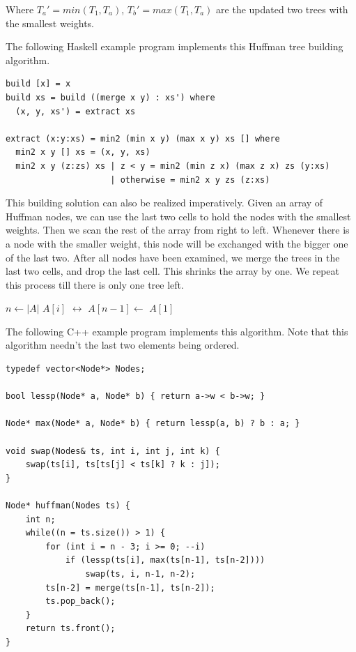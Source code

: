 \documentclass[UTF8]{article}
\begin{document}
Where $T_a' = min(T_1, T_a)$, $T_b' = max(T_1, T_a)$ are the updated two trees with
the smallest weights.

The following Haskell example program implements this Huffman tree building algorithm.

\lstset{language=Haskell}
\begin{lstlisting}
build [x] = x
build xs = build ((merge x y) : xs') where
  (x, y, xs') = extract xs

extract (x:y:xs) = min2 (min x y) (max x y) xs [] where
  min2 x y [] xs = (x, y, xs)
  min2 x y (z:zs) xs | z < y = min2 (min z x) (max z x) zs (y:xs)
                     | otherwise = min2 x y zs (z:xs)
\end{lstlisting}

This building solution can also be realized imperatively. Given an array of Huffman
nodes, we can use the last two cells to hold the nodes with the smallest weights.
Then we scan the rest of the array from right to left. Whenever there is a node with
the smaller weight, this node will be exchanged with the bigger one of the last two.
After all nodes have been examined, we merge the trees in the last two cells, and drop
the last cell. This shrinks the array by one. We repeat this process till there is only
one tree left.

\begin{algorithmic}[1]
    \State $n \gets |A|$
        \State {} $A[i]$ $\leftrightarrow$ 
      \EndIf
    \EndFor
    \State $A[n-1] \gets$ 
    \State {}
  \EndWhile
  \State \Return $A[1]$
\EndFunction
\end{algorithmic}

The following C++ example program implements this algorithm. Note that this algorithm
needn't the last two elements being ordered.

\lstset{language=C++}
\begin{lstlisting}
typedef vector<Node*> Nodes;

bool lessp(Node* a, Node* b) { return a->w < b->w; }

Node* max(Node* a, Node* b) { return lessp(a, b) ? b : a; }

void swap(Nodes& ts, int i, int j, int k) {
    swap(ts[i], ts[ts[j] < ts[k] ? k : j]);
}

Node* huffman(Nodes ts) {
    int n;
    while((n = ts.size()) > 1) {
        for (int i = n - 3; i >= 0; --i)
            if (lessp(ts[i], max(ts[n-1], ts[n-2])))
                swap(ts, i, n-1, n-2);
        ts[n-2] = merge(ts[n-1], ts[n-2]);
        ts.pop_back();
    }
    return ts.front();
}
\end{lstlisting}
\end{document}
